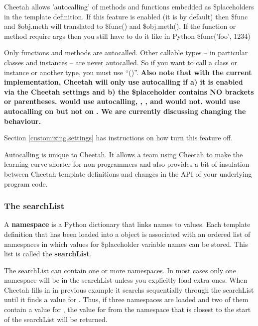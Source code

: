 Cheetah allows 'autocalling' of methods and functions embedded as
\$placeholders in the template definition.  If this feature is enabled
(it is by default) then \$func and \$obj.meth will translated to \$func() and
\$obj.meth().  If the function or method require args then you still
have to do it like in Python \$func('foo', 1234)

Only functions and methods are autocalled.  Other callable types -- in
particular classes and instances -- are never autocalled.  So if you want to
call a class or instance or another type, you must use ``()''. {\bf Also note
  that with the current implementation, Cheetah will only use autocalling if a)
  it is enabled via the Cheetah settings and b) the \$placeholder contains NO
  brackets or parentheses.   would use autocalling,
  , , and  would not.
   would use autocalling on  but not on
  .  We are currently discussing changing the behaviour.}

Section \ref{customizing.settings} has instructions on how turn this feature off.

Autocalling is unique to Cheetah.  It allows a team using Cheetah to make the
learning curve shorter for non-programmers and also provides a bit of insulation
between Cheetah template definitions and changes in the API of your underlying
program code.  

\subsubsection{The searchList}
\label{TDL.placeholders.searchList}

A {\bf namespace} is a Python dictionary that links names to values. Each
template definition that has been loaded into a  object is
associated with an ordered list of namespaces in which values for \$placeholder
variable names can be stored.  This list is called the {\bf searchList}.

The searchList can contain one or more namespaces.  In most cases only one
namespace will be in the searchList unless you explicitly load extra ones.  When
Cheetah fills in  in previous example it searchs sequentially
through the searchList until it finds a value for .  Thus, if
three namespaces are loaded and two of them contain a value for
, the value for  from the namespace that is
closest to the start of the searchList will be returned.

